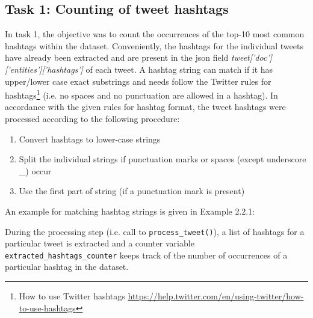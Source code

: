 \documentclass[paper=a4, fontsize=11pt]{scrartcl}
\numberwithin{equation}{section}		%
\numberwithin{figure}{section}			%
\numberwithin{table}{section}				%
\begin{document}
\subsection{Task 1: Counting of tweet hashtags}
\label{cha:task_1}
In task 1, the objective was to count the occurrences of the top-10 most common hashtags within the dataset. Conveniently, the hashtags for the individual tweets have already been extracted and are present in the \acrshort{json} field \emph{tweet['doc']['entities']['hashtags']} of each tweet. 
A hashtag string can match if it has upper/lower case exact substrings and needs follow the Twitter rules for hashtags\footnote{How to use Twitter hashtags \url{https://help.twitter.com/en/using-twitter/how-to-use-hashtags}} (i.e. no spaces and no punctuation are allowed in a hashtag). 
In accordance with the given rules for hashtag format, the tweet hashtags were processed according to the following procedure:
\begin{enumerate}
  \item Convert hashtags to lower-case strings
  \item Split the individual strings if punctuation marks or spaces (except underscore \_) occur
  \item Use the first part of string (if a punctuation mark is present)
\end{enumerate}
An example for matching hashtag strings is given in Example 2.2.1: 
\vspace{5pt}
\newline
\vspace{5pt}

During the processing step (i.e. call to \texttt{process\_tweet()}), a list of hashtags for a particular tweet is extracted and a counter variable \texttt{extracted\_hashtags\_counter} keeps track of the number of occurrences of a particular hashtag in the dataset.
\end{document}
